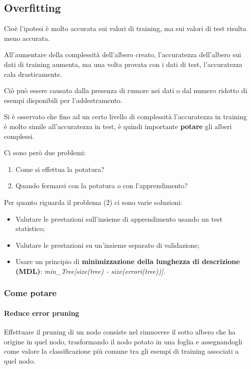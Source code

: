 \subsection{Overfitting}\label{overfitting}

Cioè l'ipotesi è molto accurata sui valori di training, ma sui valori di
test risulta meno accurata.

All'aumentare della complessità dell'albero creato, l'accuratezza
dell'albero sui dati di training aumenta, ma una volta provata con i
dati di test, l'accuratezza cala drasticamente.

Ciò può essere causato dalla presenza di rumore nei dati o dal numero ridotto
di esempi disponibili per l'addestramento.

Si è osservato che fino ad un certo livello di complessità l'accuratezza
in training è molto simile all'accuratezza in test, è quindi importante
\textbf{potare} gli alberi complessi.

Ci sono però due problemi:

\begin{enumerate}
\item
  Come si effettua la potatura?
\item
  Quando fermarsi con la potatura o con l'apprendimento?
\end{enumerate}

Per quanto riguarda il problema (2) ci sono varie soluzioni:

\begin{itemize}
\item
  Valutare le prestazioni sull'insieme di apprendimento usando un test
  statistico;
\item
  Valutare le prestazioni su un'insieme separato di validazione;
\item
  Usare un principio di \textbf{minimizzazione della lunghezza di
  descrizione (MDL)}: \emph{min\_Tree{[}size(tree) -
  size(errori(tree)){]}.}
\end{itemize}

\subsubsection{Come potare}\label{come-potare}

\paragraph{Reduce error pruning}\label{reduce-error-pruning}

Effettuare il pruning di un nodo consiste nel rimuovere il sotto albero
che ha origine in quel nodo, trasformando il nodo potato in una foglia e
assegnandogli come valore la classificazione più comune tra gli esempi
di training associati a quel nodo.

